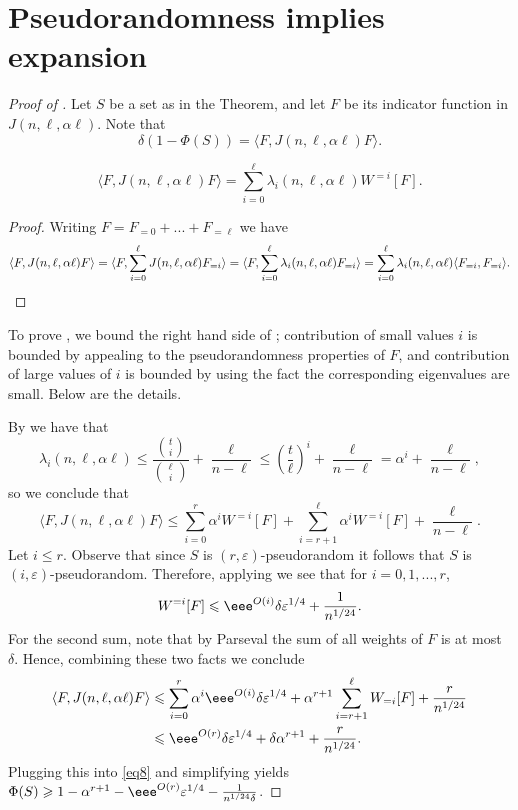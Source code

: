 \documentclass{toc}
\newcommand\inner[2]{\langle{#1},{#2}\rangle}
\newcommand\eps{\varepsilon}
\renewcommand\geq{\geqslant}
\renewcommand\leq{\leqslant}
\newcommand\expp[1]{\eee^{O({#1})}}
\newcommand\lvlfn[2]{{#1}_{={#2}}}
\begin{document}
\section{Pseudorandomness implies expansion}\label{section:exp_pf}
\begin{proof}[Proof of ]
Let $S$ be a set as in the Theorem, and let $F$ be its indicator function in $J(n,\ell,\alpha \ell)$.
Note that
\begin{equation}\label{eq8}
\delta(1 - \Phi(S)) = \inner{F}{J(n,\ell,\alpha\ell) F}.
\end{equation}
\begin{claim}\label{claim:express_expansion}
\[
\inner{F}{J(n,\ell,\alpha\ell) F} = \sum\limits_{i=0}^{\ell}{\lambda_i(n,\ell,\alpha\ell) W^{=i}[F]}.
\]
\end{claim}
\begin{proof}
Writing $F=\lvlfn{F}{0}+...+\lvlfn{F}{\ell}$ we have
\[
\inner{F}{J(n,\ell,\alpha\ell) F}
=
\inner{F}{\sum\limits_{i=0}^{\ell}{J(n,\ell,\alpha\ell) \lvlfn{F}{i}}}
=
\inner{F}{\sum\limits_{i=0}^{\ell}{\lambda_i(n,\ell,\alpha\ell) \lvlfn{F}{i}}}
=\sum\limits_{i=0}^{\ell}\lambda_i(n,\ell,\alpha\ell) \inner{\lvlfn{F}{i}}{\lvlfn{F}{i}}.%
\qedhere    %
\]
\end{proof}
To prove , we bound the right hand side of ; contribution of small %
values $i$  %
is bounded
by appealing to the pseudorandomness properties of $F$, and contribution of large
%
values of $i$  %
is bounded by using the fact the corresponding eigenvalues
are small. Below are the details.

By  we have that
\[
\lambda_i(n,\ell,\alpha\ell)
\leq \frac{\binom{t}{i}}{\binom{\ell}{i}} + \frac{\ell}{n-\ell}
\leq \left(\frac{t}{\ell}\right)^i + \frac{\ell}{n-\ell}
=\alpha^{i} + \frac{\ell}{n-\ell},
\]
so we conclude that
\[
\inner{F}{J(n,\ell,\alpha\ell) F}
\leq \sum\limits_{i=0}^{r}{\alpha^i W^{=i}[F]}
     + \sum\limits_{i=r+1}^{\ell}{\alpha^i W^{=i}[F]}
     +\frac{\ell}{n-\ell}.
\]
Let $i\leq r$. Observe that since $S$ is $(r,\eps)$-pseudorandom it follows that $S$ is $(i,\eps)$-pseudorandom.
Therefore, applying  we see that for $i=0,1,...,r$,
\[
W^{=i}[F]\leq
\expp{i} \delta\eps^{1/4} + \frac{1}{n^{1/24}}.
\]
For the second sum, note that by Parseval the sum of all weights of $F$ is at most $\delta$. Hence, combining these two facts
we conclude
\begin{align*}
\inner{F}{J(n,\ell,\alpha\ell) F}
&\leq  \sum\limits_{i=0}^{r}{\alpha^i \expp{i} \delta\eps^{1/4}}
+\alpha^{r+1} \sum\limits_{i=r+1}^{\ell}{W_{=i}[F]}
+\frac{r}{n^{1/24}} \\
&\leq
\expp{r} \delta\eps^{1/4}
+\delta \alpha^{r+1}
+\frac{r}{n^{1/24}} .
\end{align*}
Plugging this into \eqref{eq8} and simplifying yields $\Phi(S) \geq 1 - \alpha^{r+1} - \expp{r} \eps^{1/4} - \frac{1}{n^{1/24}\delta}$.
%
\end{proof}
\end{document}
